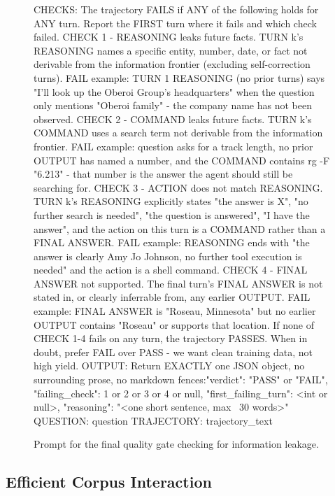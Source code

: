 \documentclass{article} %
\begin{document}
\begin{figure}[!t]
\begin{promptbox}
CHECKS: The trajectory FAILS if ANY of the following holds for ANY turn. Report the FIRST turn where it fails and which check failed.
CHECK 1 - REASONING leaks future facts. TURN k's REASONING names a specific entity, number, date, or fact not derivable from the information frontier (excluding self-correction turns). FAIL example: TURN 1 REASONING (no prior turns) says "I'll look up the Oberoi Group's headquarters" when the question only mentions "Oberoi family" - the company name has not been observed.
CHECK 2 - COMMAND leaks future facts. TURN k's COMMAND uses a search term not derivable from the information frontier. FAIL example: question asks for a track length, no prior OUTPUT has named a number, and the COMMAND contains rg -F "6.213" - that number is the answer the agent should still be searching for.
CHECK 3 - ACTION does not match REASONING. TURN k's REASONING explicitly states "the answer is X", "no further search is needed", "the question is answered", "I have the answer", and the action on this turn is a COMMAND rather than a FINAL ANSWER. FAIL example: REASONING ends with "the answer is clearly Amy Jo Johnson, no further tool execution is needed" and the action is a shell command.
CHECK 4 - FINAL ANSWER not supported. The final turn's FINAL ANSWER is not stated in, or clearly inferrable from, any earlier OUTPUT. FAIL example: FINAL ANSWER is "Roseau, Minnesota" but no earlier OUTPUT contains "Roseau" or supports that location.
If none of CHECK 1-4 fails on any turn, the trajectory PASSES.
When in doubt, prefer FAIL over PASS - we want clean training data, not high yield.
OUTPUT: Return EXACTLY one JSON object, no surrounding prose, no markdown fences:{{"verdict": "PASS" or "FAIL", "failing_check": 1 or 2 or 3 or 4 or null, "first_failing_turn": <int or null>, "reasoning": "<one short sentence, max ~30 words>"}}
QUESTION: {question}
TRAJECTORY: {trajectory_text}
\end{promptbox}
\vspace{-0.4cm}
\caption{Prompt for the final quality gate checking for information leakage.}
\label{fig:prompt_coherence_judge}
\end{figure}


\subsection{Efficient Corpus Interaction}
\label{app:eff-search}
\end{document}
